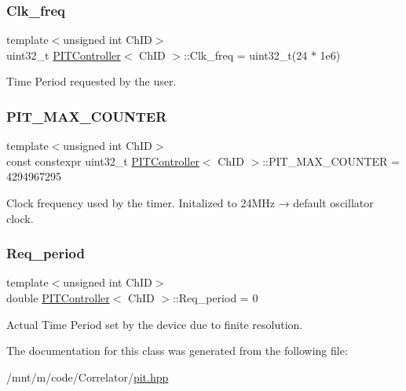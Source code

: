 \subsubsection{\texorpdfstring{Clk\+\_\+freq}{Clk\_freq}}
{\footnotesize\ttfamily template$<$unsigned int Ch\+ID$>$ \\
uint32\+\_\+t \hyperlink{classPITController}{P\+I\+T\+Controller}$<$ Ch\+ID $>$\+::Clk\+\_\+freq = uint32\+\_\+t(24 $\ast$ 1e6)}



Time Period requested by the user. 

\mbox{\label{classPITController_a53778fe7e47ac9741bef0bc190e0646a}} 
\subsubsection{\texorpdfstring{P\+I\+T\+\_\+\+M\+A\+X\+\_\+\+C\+O\+U\+N\+T\+ER}{PIT\_MAX\_COUNTER}}
{\footnotesize\ttfamily template$<$unsigned int Ch\+ID$>$ \\
const constexpr uint32\+\_\+t \hyperlink{classPITController}{P\+I\+T\+Controller}$<$ Ch\+ID $>$\+::P\+I\+T\+\_\+\+M\+A\+X\+\_\+\+C\+O\+U\+N\+T\+ER = 4294967295\hspace{0.3cm}{\ttfamily [static]}}



Clock frequency used by the timer. Initalized to 24\+M\+Hz → default oscillator clock. 

\mbox{\label{classPITController_a9de0af49a52145c8d2a8f4e90a519b60}} 
\subsubsection{\texorpdfstring{Req\+\_\+period}{Req\_period}}
{\footnotesize\ttfamily template$<$unsigned int Ch\+ID$>$ \\
double \hyperlink{classPITController}{P\+I\+T\+Controller}$<$ Ch\+ID $>$\+::Req\+\_\+period = 0}



Actual Time Period set by the device due to finite resolution. 



The documentation for this class was generated from the following file\+:\begin{DoxyCompactItemize}
\item 
/mnt/m/code/\+Correlator/\hyperlink{pit_8hpp}{pit.\+hpp}\end{DoxyCompactItemize}
